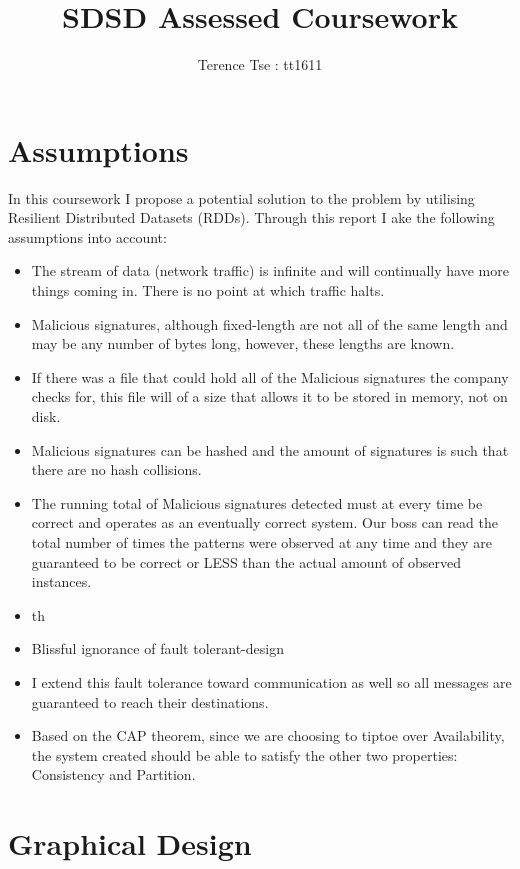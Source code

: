 \documentclass[11pt]{article}
\begin{document}
\title{SDSD Assessed Coursework}
\author{Terence Tse : tt1611}
\maketitle
\newpage

\section{Assumptions}
In this coursework I propose a potential solution to the problem
by utilising Resilient Distributed Datasets (RDDs). Through this
report I ake the following assumptions into account:
\begin{itemize}
\item The stream of data (network traffic) is infinite and 
will continually have more things coming in. There is no point
at which traffic halts.
\item Malicious signatures, although fixed-length are not all of
the same length and may be any number of bytes long, however,
these lengths are known.
\item If there was a file that could hold all of the Malicious
signatures the company checks for, this file will of a size
that allows it to be stored in memory, not on disk.
\item Malicious signatures can be hashed and the amount of
signatures is such that there are no hash collisions.
\item The running total of Malicious signatures detected must at
every time be correct and operates as an eventually correct 
system. Our boss can read the total number of times the patterns
were observed at any time and they are guaranteed to be correct
or LESS than the actual amount of observed instances. 
\item th
\item Blissful ignorance of fault tolerant-design
\item I extend this fault tolerance toward communication as well
so all messages are guaranteed to reach their destinations.
\item Based on the CAP theorem, since we are choosing to 
tiptoe over Availability, the system created should be able
to satisfy the other two properties: Consistency and Partition.
\end{itemize}


\section{Graphical Design}
\end{document}
